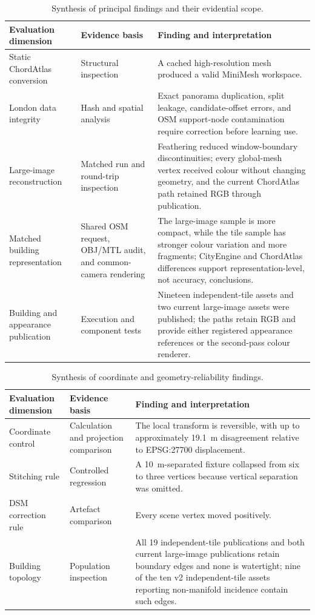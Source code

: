 \begin{table}[H]
\centering
\caption{Synthesis of principal findings and their evidential scope.}
\label{tab:results-synthesis}
\small
\begin{tabularx}{\textwidth}{X p{}X}
\toprule
Evaluation dimension & Evidence basis & Finding and interpretation\\
\midrule
Static ChordAtlas conversion & Structural inspection & A cached high-resolution mesh produced a valid MiniMesh workspace.\\
London data integrity & Hash and spatial analysis & Exact panorama duplication, split leakage, candidate-offset errors, and OSM support-node contamination require correction before learning use.\\
Large-image reconstruction & Matched run and round-trip inspection & Feathering reduced window-boundary discontinuities; every global-mesh vertex received colour without changing geometry, and the current ChordAtlas path retained RGB through publication.\\
Matched building representation & Shared OSM request, OBJ/MTL audit, and common-camera rendering & The large-image sample is more compact, while the tile sample has stronger colour variation and more fragments; CityEngine and ChordAtlas differences support representation-level, not accuracy, conclusions.\\
Building and appearance publication & Execution and component tests & Nineteen independent-tile assets and two current large-image assets were published; the paths retain RGB and provide either registered appearance references or the second-pass colour renderer.\\
\bottomrule
\end{tabularx}
\end{table}

\begin{table}[H]
\centering
\caption{Synthesis of coordinate and geometry-reliability findings.}
\label{tab:results-synthesis-reliability}
\small
\begin{tabularx}{\textwidth}{X p{}X}
\toprule
Evaluation dimension & Evidence basis & Finding and interpretation\\
\midrule
Coordinate control & Calculation and projection comparison & The local transform is reversible, with up to approximately \SI{19.1}{\metre} disagreement relative to EPSG:27700 displacement.\\
Stitching rule & Controlled regression & A \SI{10}{\metre}-separated fixture collapsed from six to three vertices because vertical separation was omitted.\\
DSM correction rule & Artefact comparison & Every scene vertex moved positively.\\
Building topology & Population inspection & All 19 independent-tile publications and both current large-image publications retain boundary edges and none is watertight; nine of the ten v2 independent-tile assets reporting non-manifold incidence contain such edges.\\
\bottomrule
\end{tabularx}
\end{table}
